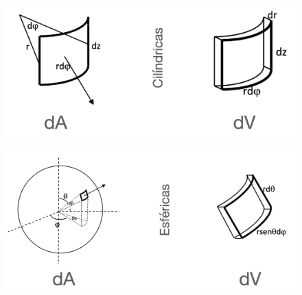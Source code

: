 \begin{multicols}{2}
\begin{figure}[H]
	\centering
	\includegraphics[width=.5\textwidth]{img-coordenadas/coordenadas-12.png}
	\end{figure}
	
\begin{figure}[H]
	\centering
	\includegraphics[width=.45\textwidth]{img-coordenadas/coordenadas-13.png}
	\end{figure}
\end{multicols}

